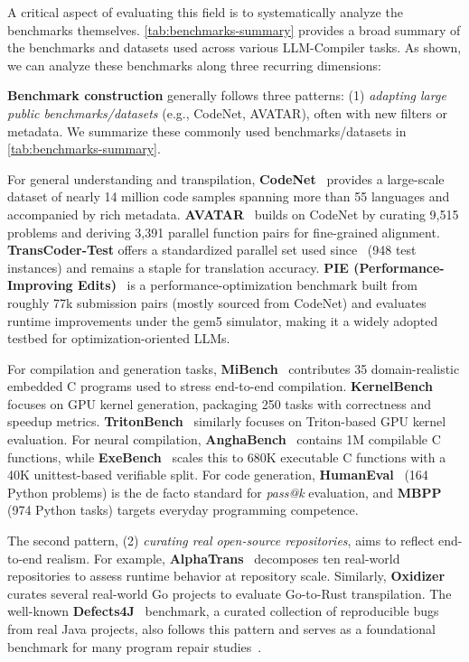 \documentclass[pdflatex,sn-mathphys-ay,twocolumn, a4paper]{sn-jnl}%
\theoremstyle{thmstyleone}%
\theoremstyle{thmstyletwo}%
\theoremstyle{thmstylethree}%
\begin{document}
A critical aspect of evaluating this field is to systematically analyze the benchmarks themselves. \autoref{tab:benchmarks-summary} provides a broad summary of the benchmarks and datasets used across various LLM-Compiler tasks. As shown, we can analyze these benchmarks along three recurring dimensions:


\textbf{Benchmark construction} generally follows three patterns: (1) \textit{adapting large public benchmarks/datasets} (e.g., CodeNet, AVATAR), often with new filters or metadata. We summarize these commonly used benchmarks/datasets in \autoref{tab:benchmarks-summary}.

For general understanding and transpilation, \textbf{CodeNet}~\citep{codenet} provides a large-scale dataset of nearly 14 million code samples spanning more than 55 languages and accompanied by rich metadata. \textbf{AVATAR}~\citep{avatar} builds on CodeNet by curating 9,515 problems and deriving 3,391 parallel function pairs for fine-grained alignment. \textbf{TransCoder-Test} offers a standardized parallel set used since~\citet{177_transcoder} (948 test instances) and remains a staple for translation accuracy. \textbf{PIE (Performance-Improving Edits)}~\citep{pie} is a performance-optimization benchmark built from roughly 77k submission pairs (mostly sourced from CodeNet) and evaluates runtime improvements under the gem5 simulator, making it a widely adopted testbed for optimization-oriented LLMs.

For compilation and generation tasks, \textbf{MiBench}~\citep{mibench} contributes 35 domain-realistic embedded C programs used to stress end-to-end compilation. \textbf{KernelBench}~\citep{kernelbench_2025_icml} focuses on GPU kernel generation, packaging 250 tasks with correctness and speedup metrics. \textbf{TritonBench}~\citep{tritonbench_2025_acl} similarly focuses on Triton-based GPU kernel evaluation. For neural compilation, \textbf{AnghaBench}~\citep{anghabench} contains 1M compilable C functions, while \textbf{ExeBench}~\citep{exebench_2022_maps} scales this to 680K executable C functions with a 40K unittest-based verifiable split. For code generation, \textbf{HumanEval}~\citep{humaneval} (164 Python problems) is the de facto standard for \textit{pass@k} evaluation, and \textbf{MBPP}~\citep{mbpp} (974 Python tasks) targets everyday programming competence.

The second pattern, (2) \textit{curating real open-source repositories}, aims to reflect end-to-end realism. For example, \textbf{AlphaTrans}~\citep{91_alphatrans2025_fse} decomposes ten real-world repositories to assess runtime behavior at repository scale. Similarly, \textbf{Oxidizer}~\citep{60_zhang2025_pldi} curates several real-world Go projects to evaluate Go-to-Rust transpilation. The well-known \textbf{Defects4J}~\citep{defects4j} benchmark, a curated collection of reproducible bugs from real Java projects, also follows this pattern and serves as a foundational benchmark for many program repair studies~\citep{133_xia2023_icse, 131_wei2023_fse}.
\end{document}
